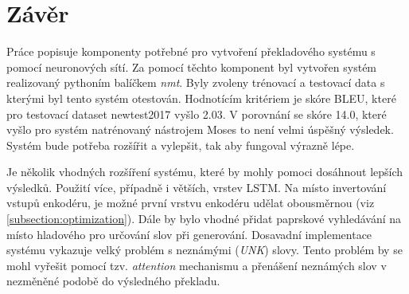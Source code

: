 \chapter{Závěr}
Práce popisuje komponenty potřebné pro vytvoření překladového systému s pomocí neuronových sítí. Za pomocí těchto komponent byl vytvořen systém realizovaný pythoním balíčkem \emph{nmt}. Byly zvoleny trénovací a testovací data s kterými byl tento systém otestován. Hodnotícím kritériem je skóre BLEU, které pro testovací dataset newtest2017 vyšlo 2.03. V porovnání se skóre 14.0, které vyšlo pro systém natrénovaný nástrojem Moses to není velmi úspěšný výsledek. Systém bude potřeba rozšířit a vylepšit, tak aby fungoval výrazně lépe.

Je několik vhodných rozšíření systému, které by mohly pomoci dosáhnout lepších výsledků. Použití více, případně i větších, vrstev LSTM. Na místo invertování vstupů enkodéru, je možné první vrstvu enkodéru udělat obousměrnou (viz \ref{subsection:optimization}). Dále by bylo vhodné přidat paprskové vyhledávání na místo hladového pro určování slov při generování. Dosavadní implementace systému vykazuje velký problém s neznámými (\emph{UNK}) slovy. Tento problém by se mohl vyřešit pomocí tzv. \emph{attention} mechanismu a přenášení neznámých slov v nezměněné podobě do výsledného překladu.


